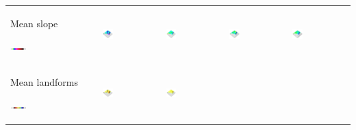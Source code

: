 \documentclass[prodmode,acmtochi]{acmsmall} %
\begin{document}
\begin{table}
{\begin{tabular}{m{} m{} m{} m{} m{}}
%
Mean slope \par \vspace{0.5em} \includegraphics[width=0.19\textwidth]{images/legends/slope_legend.pdf} & 
\includegraphics[width=0.19\textwidth]{images/render_3d/slope_1.png} &
\includegraphics[width=0.19\textwidth]{images/render_3d/mean_slope_1.png} &
\includegraphics[width=0.19\textwidth]{images/render_3d/mean_slope_2.png} &
\includegraphics[width=0.19\textwidth]{images/render_3d/mean_slope_3.png}\\
%
Mean landforms \par \vspace{0.5em} \includegraphics[width=0.19\textwidth]{images/legends/forms_legend.pdf} & 
\includegraphics[width=0.19\textwidth]{images/render_3d/forms_1.png} &
\includegraphics[width=0.19\textwidth]{images/render_3d/mean_forms_1.png} &

\end{tabular}}
\end{table}
\end{document}
